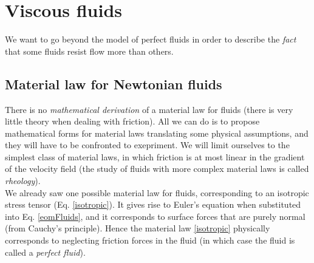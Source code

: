 \documentclass[DIV=12]{article}
\begin{document}
\section{Viscous fluids}

 We want to go beyond the model of perfect fluids in order to describe the {\emph{fact}}
 that some fluids resist flow more than others.

\subsection{Material law for Newtonian fluids}

 There is no {\emph{mathematical derivation}} of a material law for fluids (there is very little theory
 when dealing with friction). 
 All we can do is to propose mathematical forms for material laws translating
 some physical assumptions, and they will have to be confronted to exepriment.
 We will limit ourselves to the simplest class of material laws, in which friction 
 is at most linear in the gradient of the velocity field (the study of fluids with more complex
 material laws is called {\emph{rheology}}).\\


 We already saw one possible material law for fluids, corresponding to an isotropic 
 stress tensor (Eq. \ref{isotropic}).
 It gives rise to Euler's equation when substituted into Eq. \ref{eomFluids},
 and it corresponds to surface  forces that are purely normal (from Cauchy's principle).
 Hence the material law \ref{isotropic} physically corresponds to neglecting 
 friction forces in the fluid (in which case the fluid is called a {\emph{perfect fluid}}).\\
\end{document}
